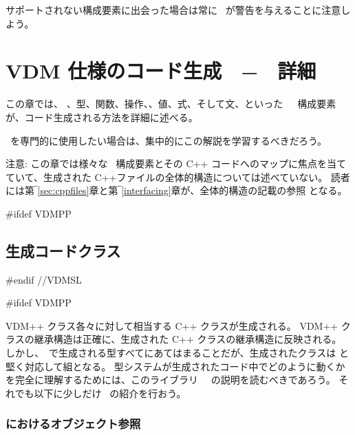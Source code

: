 \documentclass[\pformat,12pt]{jarticle}
\begin{document}
サポートされない構成要素に出会った場合は常に \Tcg\ が警告を与えることに注意しよう。

%



\section{VDM 仕様のコード生成　−　詳細}\label{sec:relation}

この章では、 、型、関数、操作、、値、式、そして文、といった　\VDM\ 構成要素が、コード生成される方法を詳細に述べる。

 \tcg\ を専門的に使用したい場合は、集中的にこの解説を学習するべきだろう。

注意: この章では様々な \VDM\ 構成要素とその C++ コードへのマップに焦点を当てていて、生成された C++ファイルの全体的構造については述べていない。
読者には第‾\ref{sec:cppfiles}章と第‾\ref{interfacing}章が、全体的構造の記載の参照 となる。


#ifdef VDMPP
\subsection{生成コードクラス}\label{sec:classes}
#endif //VDMSL


#ifdef VDMPP

VDM++ クラス各々に対して相当する C++ クラスが生成される。
 VDM++ クラスの継承構造は正確に、生成された C++ クラスの継承構造に反映される。
しかし、\tcg　で生成される型すべてにあてはまることだが、生成されたクラスは \MCL と堅く対応して組となる。
型システムが生成されたコード中でどのように動くかを完全に理解するためには、このライブラリ \libmancite　の説明を読むべきであろう。  
それでも以下に少しだけ \MCL\ の紹介を行おう。

\subsubsection{\MCL におけるオブジェクト参照}
\end{document}
